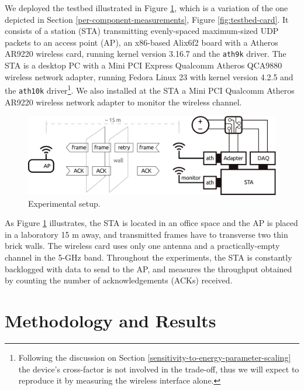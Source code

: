 \documentclass[twoside,nohyper]{tufte-book}
\begin{document}
We deployed the testbed illustrated in Figure \ref{fig:testbedexp}, which is a variation of the one depicted in Section \ref{per-component-measurements}, Figure \ref{fig:testbed-card}. It consists of a station (STA) transmitting evenly-spaced maximum-sized UDP packets to an access point (AP), an x86-based Alix6f2 board with a Atheros AR9220 wireless card, running kernel version 3.16.7 and the \texttt{ath9k} driver. The STA is a desktop PC with a Mini PCI Express Qualcomm Atheros QCA9880 wireless network adapter, running Fedora Linux 23 with kernel version 4.2.5 and the \texttt{ath10k} driver\footnote{Following the discussion on Section \ref{sensitivity-to-energy-parameter-scaling} the device's cross-factor is not involved in the trade-off, thus we will expect to reproduce it by measuring the wireless interface alone.}. We also installed at the STA a Mini PCI Qualcomm Atheros AR9220 wireless network adapter to monitor the wireless channel.



\begin{figure}

{\centering \includegraphics{img/06/testbed} 

}

\caption[Experimental setup.]{Experimental setup.}\label{fig:testbedexp}
\end{figure}

As Figure \ref{fig:testbedexp} illustrates, the STA is located in an office space and the AP is placed in a laboratory 15 m away, and transmitted frames have to transverse two thin brick walls. The wireless card uses only one antenna and a practically-empty channel in the 5-GHz band. Throughout the experiments, the STA is constantly backlogged with data to send to the AP, and measures the throughput obtained by counting the number of acknowledgements (ACKs) received.

\hypertarget{methodology-and-results}{%
\section{Methodology and Results}\label{methodology-and-results}}
\end{document}
